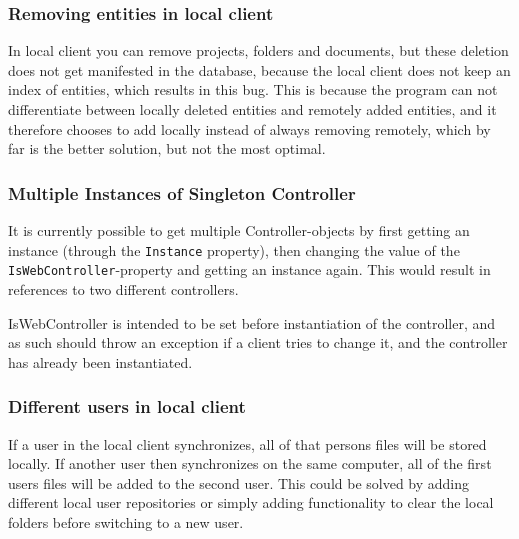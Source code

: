 \subsubsection{Removing entities in local client}
In local client you can remove projects, folders and documents, but these deletion does not get manifested in the database, because the local client does not keep an index of entities, which results in this bug. This is because the program can not differentiate between locally deleted entities and remotely added entities, and it therefore chooses to add locally instead of always removing remotely, which by far is the better solution, but not the most optimal.

\subsubsection{Multiple Instances of Singleton Controller}
It is currently possible to get multiple Controller-objects by first getting an instance (through the \verb|Instance| property),
then changing the value of the \verb|IsWebController|-property and getting an instance again. This would result in references to
two different controllers.

IsWebController is intended to be set before instantiation of the controller, and as such should throw an exception if a client tries
to change it, and the controller has already been instantiated.

\subsubsection{Different users in local client}
If a user in the local client synchronizes, all of that persons files will be stored locally. If another user then synchronizes on the same computer, all of the first users files will be added to the second user. This could be solved by adding different local user repositories or simply adding functionality to clear the local folders before switching to a new user.